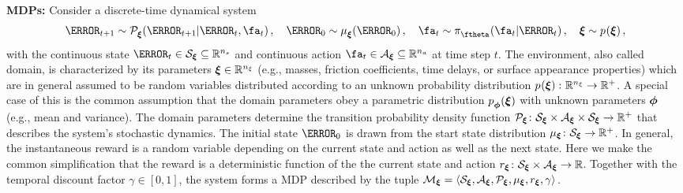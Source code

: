 \documentclass[utf8]{frontiersSCNS} %
\begin{document}
\noindent\textbf{\acfp{MDP}:} Consider a discrete-time dynamical system
\begin{equation}
	\fs_{t+1} \sim \transprob[\domparams]{\given{\fs_{t+1}}{\fs_t, \fa_t}}, \quad
	\fs_0 \sim \initstatedistr[\domparams]{\fs_0}, \quad
	\fa_t \sim \pol[\polparams]{\given{\fa_t}{\fs_t}}, \quad
	\domparams \sim \domparamdistr{\domparams},
\end{equation}
with the continuous state ${\fs_t \in \stateset[\domparams] \subseteq \RR^{\dimstate}}$ and continuous action ${\fa_t \in \actionset[\domparams] \subseteq \RR^{\dimact}}$ at time step $t$.
The environment, also called domain, is characterized by its parameters ${\domparams \in \RR^{\dimdomparam}}$ (e.g., masses, friction coefficients, time delays, or surface appearance properties) which are in general assumed to be random variables distributed according to an unknown probability distribution ${\domparamdistr{\domparams} \colon \RR^{\dimdomparam} \to \RR^{+}}$.
A special case of this is the common assumption that the domain parameters obey a parametric distribution $\domparamdistr[\domdistrparams]{\domparams}$ with unknown parameters $\domdistrparams$ (e.g., mean and variance). 
The domain parameters determine the transition probability density function ${\transprobsym_{\domparams} \colon \stateset[\domparams] \times \actionset[\domparams] \times \stateset[\domparams] \to \RR^{+}}$ that describes the system's stochastic dynamics.
The initial state $\fs_0$ is drawn from the start state distribution ${\initstatedistrsym_{\domparams} \colon \stateset[\domparams] \to \RR^{+}}$.
In general, the instantaneous reward is a random variable depending on the current state and action as well as the next state.
Here we make the common simplification that the reward is a deterministic function of the the current state and action ${\rewsym_{\domparams} \colon \stateset[\domparams] \times \actionset[\domparams] \to \RR}$.
Together with the temporal discount factor ${\gamma \in [0,1]}$, the system forms a \ac{MDP} described by the tuple ${\mdp[\domparams] = \tuple{\stateset[\domparams], \actionset[\domparams], \transprobsym_{\domparams}, \initstatedistrsym_{\domparams}, \rewsym_{\domparams}, \gamma}}$.
\end{document}
